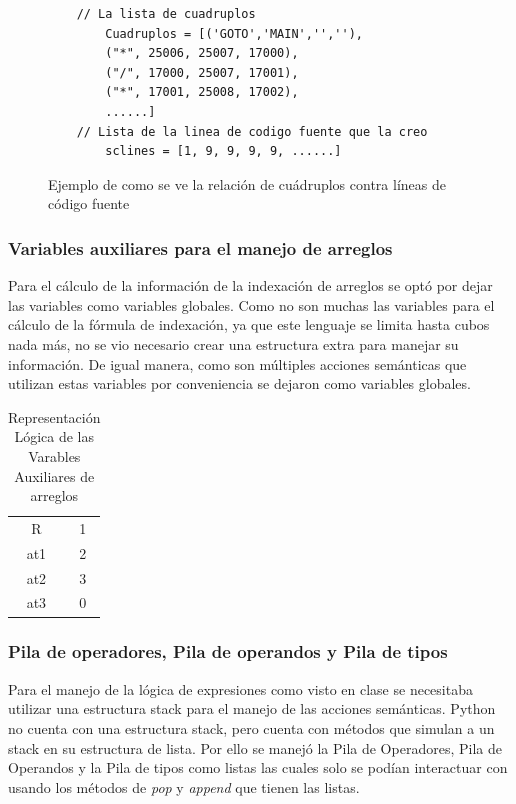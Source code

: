 \begin{figure}[htbp]
    \centering
    \begin{lstlisting}
    // La lista de cuadruplos
        Cuadruplos = [('GOTO','MAIN','',''), 
        ("*", 25006, 25007, 17000), 
        ("/", 17000, 25007, 17001), 
        ("*", 17001, 25008, 17002), 
        ......]
    // Lista de la linea de codigo fuente que la creo
        sclines = [1, 9, 9, 9, 9, ......]
    \end{lstlisting}
    \caption{Ejemplo de como se ve la relación de cuádruplos contra líneas de código fuente}
    \label{fig:my_label}
\end{figure}
\FloatBarrier
\subsubsection{Variables auxiliares para el manejo de arreglos}

Para el cálculo de la información de la indexación de arreglos se optó por dejar las variables como variables globales. Como no son muchas las variables para el cálculo de la fórmula de indexación, ya que este lenguaje se limita hasta cubos nada más, no se vio necesario crear una estructura extra para manejar su información. De igual manera, como son múltiples acciones semánticas que utilizan estas variables por conveniencia se dejaron como variables globales.


\begin{table}[htbp]
    \centering
    \begin{tabular}{|c|c|}
       R  &  1\\
      at1 & 2 \\
      at2 & 3 \\
      at3 & 0 \\
    \end{tabular}
    \caption{Representación Lógica de las Varables Auxiliares de arreglos}
    \label{tab:my_label}
\end{table}

\FloatBarrier
\subsubsection{Pila de operadores, Pila de operandos y Pila de tipos}

Para el manejo de la lógica de expresiones como visto en clase se necesitaba utilizar una estructura stack para el manejo de las acciones semánticas. Python no cuenta con una estructura stack, pero cuenta con métodos que simulan a un stack en su estructura de lista. Por ello se manejó la Pila de Operadores, Pila de Operandos y la Pila de tipos como listas las cuales solo se podían interactuar con usando los métodos de \emph{pop} y \emph{append} que tienen las listas.

